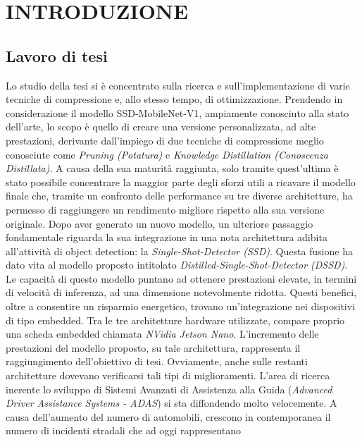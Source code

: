 
\chapter{INTRODUZIONE}
\label{Capitolo1}
\thispagestyle{empty}

\section{Lavoro di tesi}
Lo studio della tesi si è concentrato sulla ricerca e sull'implementazione di varie tecniche di compressione e, allo stesso tempo, di ottimizzazione. Prendendo in considerazione il modello SSD-MobileNet-V1, ampiamente conosciuto alla stato dell'arte, lo scopo è quello di creare una versione personalizzata, ad alte prestazioni, derivante dall'impiego di due tecniche di compressione meglio conosciute come \emph{Pruning (Potatura)} e \emph{Knowledge Distillation (Conoscenza Distillata)}. 
A causa della sua maturità raggiunta, solo tramite quest'ultima è stato possibile concentrare la maggior parte degli sforzi utili a ricavare il modello finale che, tramite un confronto delle performance su tre diverse architetture, ha permesso di raggiungere un rendimento migliore rispetto alla sua versione originale. Dopo aver generato un nuovo modello, un ulteriore passaggio fondamentale riguarda la sua integrazione in una nota architettura adibita all'attività di object detection: la \emph{Single-Shot-Detector (SSD)}.
Questa fusione ha dato vita al modello proposto intitolato \emph{Distilled-Single-Shot-Detector (DSSD)}. Le capacità di questo modello puntano ad ottenere prestazioni elevate, in termini di velocità di inferenza, ad una dimensione notevolmente ridotta. Questi benefici, oltre a consentire un risparmio energetico, trovano un'integrazione nei dispositivi di tipo embedded. Tra le tre architetture hardware utilizzate, compare proprio una scheda embedded chiamata \emph{NVidia Jetson Nano}.
L'incremento delle prestazioni del modello proposto, su tale architettura, rappresenta il raggiungimento dell'obiettivo di tesi. Ovviamente, anche sulle restanti architetture dovevano verificarsi tali tipi di miglioramenti. 
L'area di ricerca inerente lo sviluppo di Sistemi Avanzati di Assistenza 
alla Guida (\emph{Advanced Driver Assistance Systems - ADAS}) si sta diffondendo 
molto velocemente. A causa dell'aumento del numero di automobili, 
crescono in contemporanea il numero di incidenti stradali che ad oggi rappresentano 
